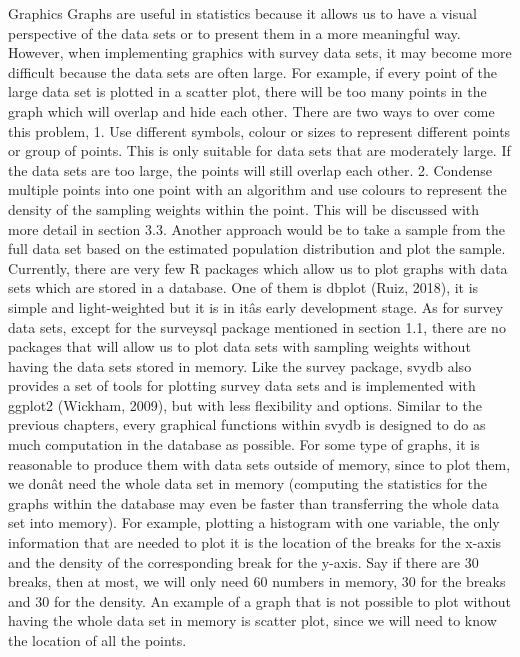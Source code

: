 Graphics
Graphs are useful in statistics because it allows us to have a visual perspective of the
data sets or to present them in a more meaningful way. However, when implementing graphics with survey data sets, it may become more difficult because the data
sets are often large. For example, if every point of the large data set is plotted in a
scatter plot, there will be too many points in the graph which will overlap and hide
each other. There are two ways to over come this problem,
1. Use different symbols, colour or sizes to represent different points or group of
points. This is only suitable for data sets that are moderately large. If the data
sets are too large, the points will still overlap each other.
2. Condense multiple points into one point with an algorithm and use colours to
represent the density of the sampling weights within the point. This will be
discussed with more detail in section 3.3.
Another approach would be to take a sample from the full data set based on the
estimated population distribution and plot the sample.
Currently, there are very few R packages which allow us to plot graphs with
data sets which are stored in a database. One of them is dbplot (Ruiz, 2018), it is
simple and light-weighted but it is in itâs early development stage. As for survey
data sets, except for the surveysql package mentioned in section 1.1, there are no
packages that will allow us to plot data sets with sampling weights without having
the data sets stored in memory.
Like the survey package, svydb also provides a set of tools for plotting survey
data sets and is implemented with ggplot2 (Wickham, 2009), but with less flexibility and options. Similar to the previous chapters, every graphical functions within
svydb is designed to do as much computation in the database as possible.
For some type of graphs, it is reasonable to produce them with data sets outside of memory, since to plot them, we donât need the whole data set in memory
(computing the statistics for the graphs within the database may even be faster than
transferring the whole data set into memory). For example, plotting a histogram
with one variable, the only information that are needed to plot it is the location of
the breaks for the x-axis and the density of the corresponding break for the y-axis.
Say if there are 30 breaks, then at most, we will only need 60 numbers in memory, 30
for the breaks and 30 for the density.
An example of a graph that is not possible to plot without having the whole data
set in memory is scatter plot, since we will need to know the location of all the points.

